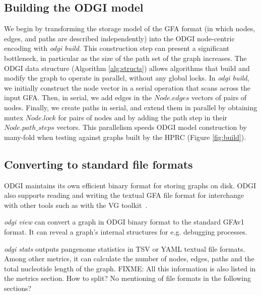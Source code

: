 \documentclass{bioinfo}
\begin{document}


\subsection{Building the \textsc{ODGI} model}
\label{sec:build}

We begin by transforming the storage model of the GFA format (in which nodes, edges, and paths are described independently) into the ODGI node-centric encoding with \textit{odgi build}.
This construction step can present a significant bottleneck, in particular as the size of the path set of the graph increases.
The ODGI data structure (Algorithm \ref{alg:structs}) allows algorithms that build and modify the graph to operate in parallel, without any global locks.
In \textit{odgi build}, we initially construct the node vector in a serial operation that scans across the input GFA. Then, in serial, we add edges in the $Node.edges$ vectors of pairs of nodes. Finally, we create paths in serial, and extend them in parallel by obtaining mutex $Node.lock$ for pairs of nodes and by adding the path step in their $Node.path\_steps$ vectors.
This parallelism speeds ODGI model construction by many-fold when testing against graphs built by the HPRC (Figure \ref{fig:build}).


\subsection{Converting to standard file formats}
\label{sec:text}

ODGI maintains its own efficient binary format for storing graphs on disk.
ODGI also supports reading and writing the textual GFA file format for interchange with other tools such as with the VG toolkit~\citep{Garrison:2018}.

\textit{odgi view} can convert a graph in ODGI binary format to the standard GFAv1~\citep{GFA} format. It can reveal a graph’s internal structures for e.g. debugging processes.

\textit{odgi stats} outputs pangenome statistics in TSV or YAML textual file formats.
Among other metrics, it can calculate the number of nodes, edges, paths and the total nucleotide length of the graph. {\color{red} FIXME: All this information is also listed in the metrics section. How to split? No mentioning of file formats in the following sections?}
\end{document}
